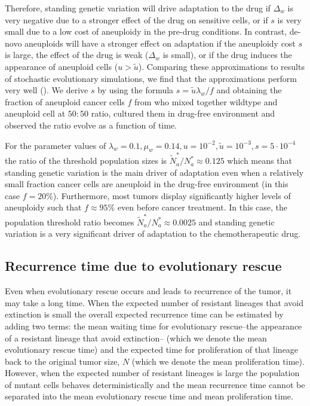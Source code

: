 \documentclass[12pt]{extarticle}
\begin{document}
Therefore, standing genetic variation will drive adaptation to the drug if $\Delta_w$ is very negative due to a stronger effect of the drug on sensitive cells, or if $s$ is very small due to a low cost of aneuploidy in the pre-drug conditions.
In contrast, de-novo aneuploids will have a stronger effect on adaptation if the aneuploidy cost $s$ is large, the effect of the drug is weak ($\Delta_w$ is small), or if the drug induces the appearance of aneuploid cells ($u > \tilde u$). Comparing these approximations to results of stochastic evolutionary simulations, we find that the approximations perform very well (). We derive $s$ by using the formula $s=\tilde{u}\lambda_w/f$ and obtaining the fraction of aneuploid cancer cells $f$ from \citep{lukow2021chromosomal} who mixed together wildtype and aneuploid cell at $50:50$ ratio, cultured them in drug-free environment and observed the ratio evolve as a function of time.  

For the parameter values of  $\lambda_w=0.1,\mu_w=0.14, u=10^{-2}, \tilde{u}=10^{-3}, s=5\cdot10^{-4}$ the ratio of the threshold population sizes is $\tilde{N}^*_a/N^*_a\approx0.125$ which means that standing genetic variation is the main driver of adaptation even when a relatively small fraction cancer cells are aneuploid in the drug-free environment (in this case $f=20\%$). Furthermore, most tumors display significantly higher levels of aneuploidy such that $f\approx 95\%$ even before cancer treatment. In this case, the population threshold ratio becomes $\tilde{N}^*_a/N^*_a\approx0.0025$ and standing genetic variation is a very significant driver of adaptation to the chemotherapeutic drug.


\subsection*{Recurrence time due to evolutionary rescue}

Even when evolutionary rescue occurs and leads to recurrence of the tumor, it may take a long time.
When the expected number of resistant lineages that avoid extinction is small the overall expected recurrence time can be estimated by adding two terms: the mean waiting time for evolutionary rescue--the appearance of a resistant lineage that avoid extinction-- (which we denote the mean evolutionary rescue time) and the expected time for proliferation of that lineage back to the original tumor size, $N$ (which we denote the mean proliferation time). However, when the expected number of resistant lineages is large the population of mutant cells behaves deterministically and the mean recurrence time cannot be separated into the mean evolutionary rescue time and mean proliferation time.
\end{document}
